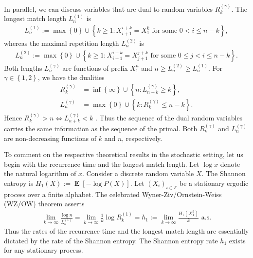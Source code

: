 \documentclass[a4paper,12pt]{article}
\newcommand{\kwad}[1]{\left[ #1 \right]}
\newcommand{\klam}[1]{\left\{ #1 \right\}}
\DeclareMathOperator{\mean}{\mathbf{E}}
\begin{document}
In parallel, we can discuss variables that are dual to random
variables $R^{(\gamma)}_k$. The longest match length $L^{(1)}_n$ is
\begin{align}
  L^{(1)}_n:=\max\klam{0}\cup\klam{k\ge 1: X_{i+1}^{i+k}=X_1^k
  \text{ for some } 0< i\le n-k},
\end{align}
whereas the maximal repetition length $L^{(2)}_n$ is
\begin{align}
  L^{(2)}_n:=\max\klam{0}\cup\klam{k\ge 1: X_{i+1}^{i+k}=X_{j+1}^{j+k}
  \text{ for some } 0\le j< i\le n-k}.
\end{align}
Both lengths $L^{(\gamma)}_n$ are functions of prefix $X_1^n$ and
$n\ge L^{(2)}_n\ge L^{(1)}_n$. For $\gamma\in\klam{1,2}$, we have the
dualities
\begin{align}
  R^{(\gamma)}_k&=\inf\klam{\infty}\cup\klam{n: L^{(\gamma)}_{n+k}\ge k},
  \\
    L^{(\gamma)}_n&=\max\klam{0}\cup\klam{k: R^{(\gamma)}_k\le n-k}.
\end{align}
Hence $R^{(\gamma)}_k>n\iff L^{(\gamma)}_{n+k}<k$
\citep{WynerZiv89}. Thus the sequence of the dual random variables
carries the same information as the sequence of the primal. Both
$R^{(\gamma)}_k$ and $L^{(\gamma)}_n$ are non-decreasing functions of
$k$ and $n$, respectively.

To comment on the respective theoretical results in the stochastic
setting, let us begin with the recurrence time and the longest match
length.  Let $\log x$ denote the natural logarithm of $x$.  Consider a
discrete random variable $X$. The Shannon entropy is
$H_1(X):=\mean\kwad{-\log P(X)}$. Let $(X_i)_{i\in\mathbb{Z}}$ be a
stationary ergodic process over a finite alphabet. The celebrated
Wyner-Ziv/Ornstein-Weiss (WZ/OW) theorem
\citep{WynerZiv89,OrnsteinWeiss93} asserts
\begin{align}
  \label{WZOW}
  \lim_{k\to\infty} \frac{\log n}{L^{(1)}_n}
  =\lim_{k\to\infty} \frac{1}{k}\log R^{(1)}_k
  =h_1:=\lim_{k\to\infty} \frac{H_1(X_1^k)}{k}
  \text{ a.s.}
\end{align}
Thus the rates of the recurrence time and the longest match length are
essentially dictated by the rate of the Shannon entropy.  The Shannon
entropy rate $h_1$ exists for any stationary process.
\end{document}
